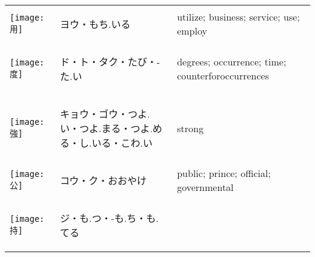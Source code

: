 \documentclass[a4paper,12pt]{extarticle}
\begin{document}
\begin{longtable}{|lp{6cm}p{4cm}|}
\\ 
\begin{minipage}{0.3\textwidth}
\centerline{
	\texttt{[image: 用]}
}
\end{minipage}
&
\begin{CJK}{UTF8}{min}ヨウ・もち.いる\end{CJK}
&
utilize; business; service; use; employ
\\ 
\begin{minipage}{0.3\textwidth}
\centerline{
	\texttt{[image: 度]}
}
\end{minipage}
&
\begin{CJK}{UTF8}{min}ド・ト・タク・たび・-た.い\end{CJK}
&
degrees; occurrence; time; counterforoccurrences
\\ 
\begin{minipage}{0.3\textwidth}
\centerline{
	\texttt{[image: 強]}
}
\end{minipage}
&
\begin{CJK}{UTF8}{min}キョウ・ゴウ・つよ.い・つよ.まる・つよ.める・し.いる・こわ.い\end{CJK}
&
strong
\\ 
\begin{minipage}{0.3\textwidth}
\centerline{
	\texttt{[image: 公]}
}
\end{minipage}
&
\begin{CJK}{UTF8}{min}コウ・ク・おおやけ\end{CJK}
&
public; prince; official; governmental
\\ 
\begin{minipage}{0.3\textwidth}
\centerline{
	\texttt{[image: 持]}
}
\end{minipage}
&
\begin{CJK}{UTF8}{min}ジ・も.つ・-も.ち・も.てる\end{CJK}

\end{longtable}
\end{document}
